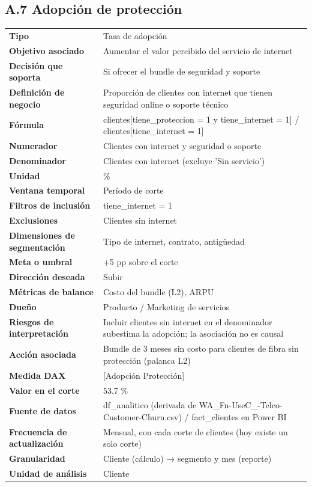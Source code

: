 \subsection*{A.7 Adopción de protección}
\begin{footnotesize}
\begin{longtable}{@{}p{}p{}@{}}
\toprule
\textbf{Tipo} & Tasa de adopción \\
\textbf{Objetivo asociado} & Aumentar el valor percibido del servicio de internet \\
\textbf{Decisión que soporta} & Si ofrecer el bundle de seguridad y soporte \\
\textbf{Definición de negocio} & Proporción de clientes con internet que tienen seguridad online o soporte técnico \\
\textbf{Fórmula} & clientes[tiene\_proteccion = 1 y tiene\_internet = 1] / clientes[tiene\_internet = 1] \\
\textbf{Numerador} & Clientes con internet y seguridad o soporte \\
\textbf{Denominador} & Clientes con internet (excluye 'Sin servicio') \\
\textbf{Unidad} & \% \\
\textbf{Ventana temporal} & Período de corte \\
\textbf{Filtros de inclusión} & tiene\_internet = 1 \\
\textbf{Exclusiones} & Clientes sin internet \\
\textbf{Dimensiones de segmentación} & Tipo de internet, contrato, antigüedad \\
\textbf{Meta o umbral} & +5 pp sobre el corte \\
\textbf{Dirección deseada} & Subir \\
\textbf{Métricas de balance} & Costo del bundle (L2), ARPU \\
\textbf{Dueño} & Producto / Marketing de servicios \\
\textbf{Riesgos de interpretación} & Incluir clientes sin internet en el denominador subestima la adopción; la asociación no es causal \\
\textbf{Acción asociada} & Bundle de 3 meses sin costo para clientes de fibra sin protección (palanca L2) \\
\textbf{Medida DAX} & [Adopción Protección] \\
\textbf{Valor en el corte} & 53.7 \% \\
\textbf{Fuente de datos} & df\_analitico (derivada de WA\_Fn-UseC\_-Telco-Customer-Churn.csv) / fact\_clientes en Power BI \\
\textbf{Frecuencia de actualización} & Mensual, con cada corte de clientes (hoy existe un solo corte) \\
\textbf{Granularidad} & Cliente (cálculo) → segmento y mes (reporte) \\
\textbf{Unidad de análisis} & Cliente \\
\bottomrule
\end{longtable}
\end{footnotesize}

